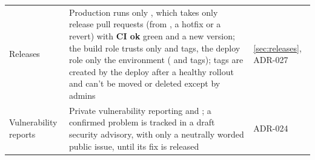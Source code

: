 \begin{xltabular}{\linewidth}{@{}P{30mm} L P{26mm}@{}}
  Releases & Production runs only , which takes only release pull requests (from , a hotfix or a revert) with \textbf{CI ok} green and a new version; the build role trusts only  and  tags, the deploy role only the  environment ( and  tags); tags are created by the deploy after a healthy rollout and can't be moved or deleted except by admins & \cref{sec:releases}, ADR-027\\
  Vulnerability reports & Private vulnerability reporting and ; a confirmed problem is tracked in a draft security advisory, with only a neutrally worded public issue, until its fix is released & ADR-024\\
  \bottomrule
\end{xltabular}

